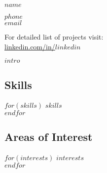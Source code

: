 \documentclass[$fontsize$, a4paper]{article}
\begin{document}
{\LARGE $name$}\\[.2cm]



\begin{multicols}{2}

$phone$\\
\href{mailto:$email$}{$email$}\\

\columnbreak

For detailed list of projects visit:\\
\href{http://linkedin.com/in/$linkedin$}{linkedin.com/in/$linkedin$}

\end{multicols}

\vspace{15pt}




$intro$



\begin{multicols}{2}

\subsection*{Skills}
$for(skills)$
$skills$\\
$endfor$

\columnbreak

\subsection*{Areas of Interest}
$for(interests)$
$interests$\\
$endfor$

\end{multicols}


\end{document}
